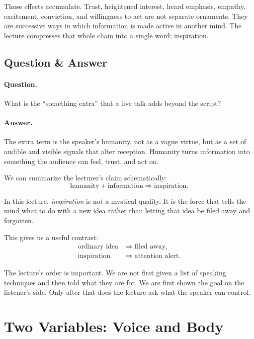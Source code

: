 Those effects accumulate. Trust, heightened interest, heard emphasis, empathy, excitement, conviction, and willingness to act are not separate ornaments. They are successive ways in which information is made active in another mind. The lecture compresses that whole chain into a single word: inspiration.

\subsection{Question \& Answer}

\paragraph{Question.} What is the ``something extra'' that a live talk adds beyond the script?

\paragraph{Answer.} The extra term is the speaker's humanity, not as a vague virtue, but as a set of audible and visible signals that alter reception. Humanity turns information into something the audience can feel, trust, and act on.

We can summarize the lecturer's claim schematically:
\begin{equation}
\text{humanity} + \text{information} \Longrightarrow \text{inspiration}.
\end{equation}

\begin{definition}
In this lecture, \emph{inspiration} is not a mystical quality. It is the force that tells the mind what to do with a new idea rather than letting that idea be filed away and forgotten.
\end{definition}

This gives us a useful contrast:
\begin{align}
\text{ordinary idea} &\Longrightarrow \text{filed away}, \\
\text{inspiration} &\Longrightarrow \text{attention alert}.
\end{align}

The lecture's order is important. We are not first given a list of speaking techniques and then told what they are for. We are first shown the goal on the listener's side. Only after that does the lecture ask what the speaker can control.

\section{Two Variables: Voice and Body}

